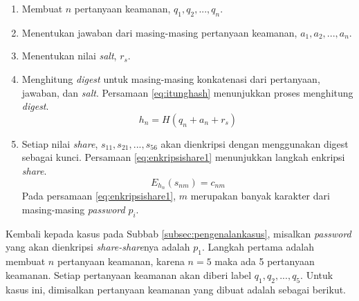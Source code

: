 \begin{enumerate}
	\item Membuat \begin{math}n\end{math} pertanyaan keamanan, \begin{math}q_1, q_2, ..., q_n\end{math}.
	\item Menentukan jawaban dari masing-masing pertanyaan keamanan, \begin{math}a_1, a_2, ..., a_n\end{math}.
	\item Menentukan nilai \textit{salt}, \begin{math}r_s\end{math}.
	\item Menghitung \textit{digest} untuk masing-masing konkatenasi dari pertanyaan, jawaban, dan \textit{salt}. Persamaan \ref{eq:itunghash} menunjukkan proses menghitung \textit{digest}.
	\begin{equation}
		h_n = H(q_n + a_n + r_s) \label{eq:itunghash}
	\end{equation}
	\item Setiap nilai \textit{share}, \begin{math}s_{11}, s_{21}, ..., s_{56}\end{math} akan dienkripsi dengan menggunakan digest sebagai kunci. Persamaan \ref{eq:enkripsishare1} menunjukkan langkah enkripsi \textit{share}.
	\begin{equation}
		E_{h_n}(s_{nm}) = c_{nm}\label{eq:enkripsishare1}
	\end{equation}
	Pada persamaan \ref{eq:enkripsishare1}, \begin{math}m\end{math} merupakan banyak karakter dari masing-masing \textit{password} \begin{math}p_i\end{math}.
\end{enumerate}

Kembali kepada kasus pada Subbab \ref{subsec:pengenalankasus}, misalkan \textit{password} yang akan dienkripsi \textit{share-share}nya adalah \begin{math}p_1\end{math}. Langkah pertama adalah membuat \begin{math}n\end{math} pertanyaan keamanan, karena \begin{math}n=5\end{math} maka ada 5 pertanyaan keamanan. Setiap pertanyaan keamanan akan diberi label \begin{math}q_1, q_2, ..., q_5\end{math}. Untuk kasus ini, dimisalkan pertanyaan keamanan yang dibuat adalah sebagai berikut.

